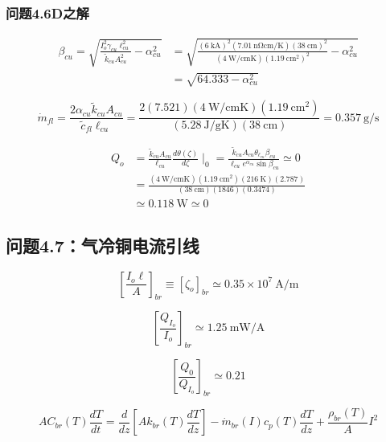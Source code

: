 \subsubsection{问题4.6D之解}
\begin{align*}
\beta_{cu}=\sqrt{\frac{I_{o}^{2}\gamma_{cu}\ell_{cu}^{2}}{\tilde{k}_{cu}A_{cu}^{2}}-\alpha_{cu}^{2}}&=\sqrt{\frac{(6\ \mathrm{kA})^2(7.01\ \mathrm{n\Omega cm/K})(38\ \mathrm{cm})^2}{(4\ \mathrm{W /cmK})(1.19\ \mathrm{cm^2})^2}-\alpha_{cu}^{2}} \\
&=\sqrt{64.333-\alpha_{cu}^{2}}
\end{align*}

\begin{equation}
\dot{m}_{fl}=\frac{2\alpha_{cu}\tilde{k}_{cu}A_{cu}}{\tilde{c}_{fl}\ell_{cu}} 
=\frac{2(7.521)(4\ \mathrm{W/cmK})(1.19\ \mathrm{cm^2})}{(5.28\ \mathrm{J/gK})(38\ \mathrm{cm})}=0.357\ \mathrm{g/s}
\end{equation}

\begin{align}%
Q_o&=\frac{\tilde{k}_{cu}A_{cu}}{\ell_{cu}}\frac{d\theta(\zeta)}{d\zeta}\mid_0=\frac{\tilde{k}_{cu}A_{cu}\theta_{\ell_{cu}}\beta_{cu}}{\ell_{cu}e^{\alpha_{cu}}\sin\beta_{cu}}\simeq 0 \\
&=\frac{(4\ \mathrm{W/cmK})(1.19\ \mathrm{cm^2})(216\ \mathrm{K})(2.787)}{(38\ \mathrm{cm})(1846)(0.3474)}\\
&\simeq 0.118\ \mathrm{W}\simeq 0
\end{align}



\subsection{问题4.7：气冷铜电流引线}

\begin{equation}%
\left[\frac{I_o\ell}{A}\right]_{br}\equiv[\zeta_o]_{br}\simeq0.35\times 10^7\ \mathrm{A/m}
\end{equation}

\begin{equation}%
\left[\frac{Q_{I_o}}{I_o}\right]_{br}\simeq 1.25\ \mathrm{mW/A}
\end{equation}

\begin{equation}%
\left[\frac{Q_0}{Q_{I_o}}\right]_{br}\simeq 0.21
\end{equation}

\begin{equation}%
AC_{br}(T)\frac{dT}{dt}=\frac{d}{dz}\left[Ak_{br}(T)\frac{dT}{dz}\right]-\dot{m}_{br}(I)c_p(T)\frac{dT}{dz}+\frac{\rho_{br}(T)}{A}I^2
\end{equation}

